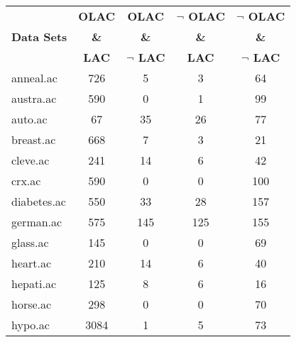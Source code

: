 \begin{table}[htbp]
	\centering
		\begin{tabular}{|l|c|c|c|c|}
		\hline
				& \textbf{OLAC}		& \textbf{OLAC}			& \textbf{$\neg$ OLAC}	& \textbf{$\neg$ OLAC}	\\
		\textbf{Data Sets}	& \textbf{\&}		& \textbf{\&}			& \textbf{\&}			& \textbf{\&}			\\
				& \textbf{LAC}		& \textbf{$\neg$ LAC}		& \textbf{LAC}			& \textbf{$\neg$ LAC}		\\
		\hline
		anneal.ac       & 726           & 5                  & 3                        & 64                            \\
		\hline
		austra.ac       & 590           & 0                  & 1                        & 99                            \\
		\hline
		auto.ac         & 67            & 35                 & 26                       & 77                            \\
		\hline
		breast.ac       & 668           & 7                  & 3                        & 21                            \\
		\hline
		cleve.ac        & 241           & 14                 & 6                        & 42                            \\
		\hline
		crx.ac          & 590           & 0                  & 0                        & 100                           \\
		\hline
		diabetes.ac     & 550           & 33                 & 28                       & 157                           \\
		\hline
		german.ac       & 575           & 145                & 125                      & 155                           \\
		\hline
		glass.ac        & 145           & 0                  & 0                        & 69                            \\
		\hline
		heart.ac        & 210           & 14                 & 6                        & 40                            \\
		\hline
		hepati.ac       & 125           & 8                  & 6                        & 16                            \\
		\hline
		horse.ac        & 298           & 0                  & 0                        & 70                            \\
		\hline
		hypo.ac         & 3084          & 1                  & 5                        & 73                            \\

\end{tabular}
\end{table}
